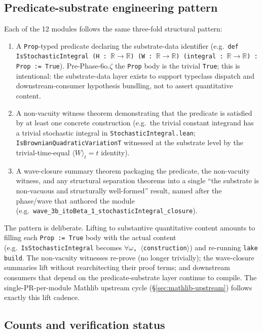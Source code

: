 \documentclass[11pt]{article}
\newcommand{\R}{\mathbb{R}}
\begin{document}
\subsection{Predicate-substrate engineering pattern}

Each of the 12 modules follows the same three-fold structural
pattern:

\begin{enumerate}
\item A \texttt{Prop}-typed predicate declaring the substrate-data
  identifier (e.g.\
  \texttt{def IsStochasticIntegral (H : $\R \to \R$) (W : $\R \to \R$)
    (integral : $\R \to \R$) : Prop := True}).
  Pre-Phase-6o.$\zeta$ the \texttt{Prop} body is the trivial
  \texttt{True}; this is intentional: the substrate-data layer
  exists to support typeclass dispatch and downstream-consumer
  hypothesis bundling, not to assert quantitative content.
\item A non-vacuity witness theorem demonstrating that the predicate
  is satisfied by at least one concrete construction (e.g.\
  the trivial constant integrand has a trivial stochastic integral
  in \texttt{StochasticIntegral.lean};
  \texttt{IsBrownianQuadraticVariationT} witnessed at the substrate
  level by the trivial-time-equal $\langle W\rangle_t = t$ identity).
\item A wave-closure summary theorem packaging the predicate, the
  non-vacuity witness, and any structural separation theorems into
  a single ``the substrate is non-vacuous and structurally well-formed''
  result, named after the phase/wave that authored the module
  (e.g.\ \texttt{wave\_3b\_itoBeta\_1\_stochasticIntegral\_closure}).
\end{enumerate}

The pattern is deliberate. Lifting to substantive
quantitative content amounts to filling each \texttt{Prop := True}
body with the actual content (e.g.\ \texttt{IsStochasticIntegral}
becomes \texttt{$\forall \omega$, $\langle$construction$\rangle$})
and re-running \texttt{lake build}. The non-vacuity witnesses
re-prove (no longer trivially); the wave-closure summaries lift
without rearchitecting their proof terms; and downstream consumers
that depend on the predicate-substrate layer continue to compile.
The single-PR-per-module Mathlib upstream cycle (\S\ref{sec:mathlib-upstream})
follows exactly this lift cadence.

\subsection{Counts and verification status}
\end{document}
